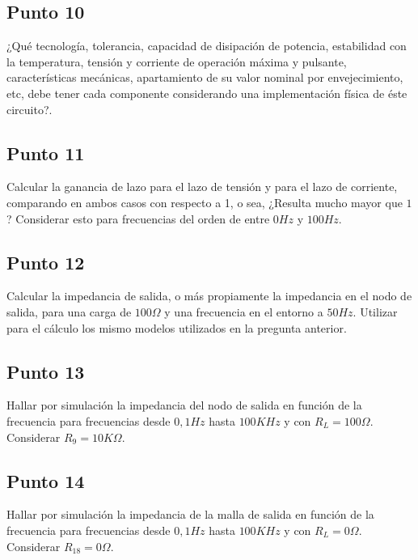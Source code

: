 \clearpage

\subsection{Punto 10}

¿Qué tecnología, tolerancia, capacidad de disipación de potencia, estabilidad con la temperatura, tensión y corriente de operación máxima y pulsante, características mecánicas, apartamiento de su valor nominal por envejecimiento, etc, debe tener cada componente considerando una implementación física de éste circuito?.

\clearpage

\subsection{Punto 11}

Calcular la ganancia de lazo  para el lazo de tensión y para el lazo de corriente, comparando en ambos casos con respecto a 1, o sea, ¿Resulta  mucho mayor que $1$? Considerar esto para frecuencias del orden de entre $0 Hz$ y $100 Hz$.

\clearpage

\subsection{Punto 12}

Calcular la impedancia de salida, o más propiamente la impedancia en el nodo de salida, para una carga de $100 \Omega$ y una frecuencia en el entorno a $50Hz$. Utilizar para el cálculo los mismo modelos utilizados en la pregunta anterior.

\clearpage

\subsection{Punto 13}

Hallar por simulación la impedancia del nodo de salida en función de la frecuencia para frecuencias desde $0,1 Hz$ hasta $100 KHz$ y con $R_{L} = 100 \Omega$. Considerar $R_{9} = 10 K\Omega$.

\clearpage

\subsection{Punto 14}

Hallar por simulación la impedancia de la malla de salida en función de la frecuencia para frecuencias desde $0,1 Hz$ hasta $100 KHz$ y con  $R_{L} = 0 \Omega$. Considerar  $R_{18} = 0 \Omega$.

